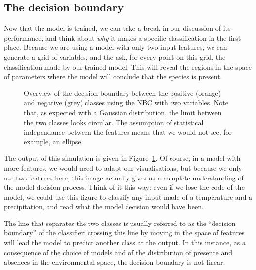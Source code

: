 \documentclass[
  letterpaper,
]{scrbook}
\begin{document}
\subsection{The decision boundary}\label{the-decision-boundary}

Now that the model is trained, we can take a break in our discussion of
its performance, and think about \emph{why} it makes a specific
classification in the first place. Because we are using a model with
only two input features, we can generate a grid of variables, and the
ask, for every point on this grid, the classification made by our
trained model. This will reveal the regions in the space of parameters
where the model will conclude that the species is present.

\begin{figure}[pbt]


\caption{\label{fig-classification-decision}Overview of the decision
boundary between the positive (orange) and negative (grey) classes using
the NBC with two variables. Note that, as expected with a Gaussian
distribution, the limit between the two classes looks circular. The
assumption of statistical independance between the features means that
we would not see, for example, an ellipse.}

\end{figure}%

The output of this simulation is given in
Figure~\ref{fig-classification-decision}. Of course, in a model with
more features, we would need to adapt our visualisations, but because we
only use two features here, this image actually gives us a complete
understanding of the model decision process. Think of it this way: even
if we lose the code of the model, we could use this figure to classify
any input made of a temperature and a precipitation, and read what the
model decision would have been.

The line that separates the two classes is usually referred to as the
``decision boundary'' of the classifier: crossing this line by moving in
the space of features will lead the model to predict another class at
the output. In this instance, as a consequence of the choice of models
and of the distribution of presence and absences in the environmental
space, the decision boundary is not linear.
\end{document}
